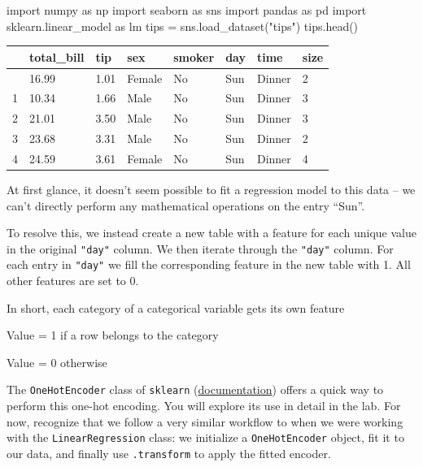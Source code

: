 \documentclass[
  letterpaper,
  DIV=11,
  numbers=noendperiod]{scrreprt}
\newenvironment{Shaded}{\begin{snugshade}}{\end{snugshade}}
\newcommand{\ImportTok}[1]{\textcolor[rgb]{0.00,0.46,0.62}{#1}}
\newcommand{\NormalTok}[1]{\textcolor[rgb]{0.00,0.23,0.31}{#1}}
\newcommand{\OperatorTok}[1]{\textcolor[rgb]{0.37,0.37,0.37}{#1}}
\newcommand{\StringTok}[1]{\textcolor[rgb]{0.13,0.47,0.30}{#1}}
\begin{document}
\begin{Shaded}
\begin{Highlighting}[]
\ImportTok{import}\NormalTok{ numpy }\ImportTok{as}\NormalTok{ np}
\ImportTok{import}\NormalTok{ seaborn }\ImportTok{as}\NormalTok{ sns}
\ImportTok{import}\NormalTok{ pandas }\ImportTok{as}\NormalTok{ pd}
\ImportTok{import}\NormalTok{ sklearn.linear\_model }\ImportTok{as}\NormalTok{ lm}
\NormalTok{tips }\OperatorTok{=}\NormalTok{ sns.load\_dataset(}\StringTok{"tips"}\NormalTok{)}
\NormalTok{tips.head()}
\end{Highlighting}
\end{Shaded}

\begin{longtable}[]{@{}llllllll@{}}
\toprule\noalign{}
& total\_bill & tip & sex & smoker & day & time & size \\
\midrule\noalign{}
\endhead
\bottomrule\noalign{}
\endlastfoot
0 & 16.99 & 1.01 & Female & No & Sun & Dinner & 2 \\
1 & 10.34 & 1.66 & Male & No & Sun & Dinner & 3 \\
2 & 21.01 & 3.50 & Male & No & Sun & Dinner & 3 \\
3 & 23.68 & 3.31 & Male & No & Sun & Dinner & 2 \\
4 & 24.59 & 3.61 & Female & No & Sun & Dinner & 4 \\
\end{longtable}

At first glance, it doesn't seem possible to fit a regression model to
this data -- we can't directly perform any mathematical operations on
the entry ``Sun''.

To resolve this, we instead create a new table with a feature for each
unique value in the original \texttt{"day"} column. We then iterate
through the \texttt{"day"} column. For each entry in \texttt{"day"} we
fill the corresponding feature in the new table with 1. All other
features are set to 0.

In short, each category of a categorical variable gets its own feature

Value = 1 if a row belongs to the category

Value = 0 otherwise

The \texttt{OneHotEncoder} class of \texttt{sklearn}
(\href{https://scikit-learn.org/stable/modules/generated/sklearn.preprocessing.OneHotEncoder.html\#sklearn.preprocessing.OneHotEncoder.get_feature_names_out}{documentation})
offers a quick way to perform this one-hot encoding. You will explore
its use in detail in the lab. For now, recognize that we follow a very
similar workflow to when we were working with the
\texttt{LinearRegression} class: we initialize a \texttt{OneHotEncoder}
object, fit it to our data, and finally use \texttt{.transform} to apply
the fitted encoder.
\end{document}
